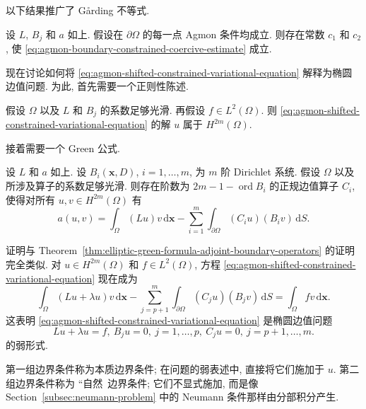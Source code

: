 以下结果推广了 Gårding 不等式.

\begin{Theorem}
\label{thm:agmon-boundary-constrained-coercivity}
设 $L$, $B_j$ 和 $a$ 如上. 假设在 $\partial\Omega$ 的每一点 Agmon 条件均成立. 则存在常数 $c_1$ 和 $c_2$, 使 \eqref{eq:agmon-boundary-constrained-coercive-estimate} 成立.
\end{Theorem}

现在讨论如何将 \eqref{eq:agmon-shifted-constrained-variational-equation} 解释为椭圆边值问题. 为此, 首先需要一个正则性陈述.

\begin{Theorem}
\label{thm:agmon-weak-variational-solution-regularity}
假设 $\Omega$ 以及 $L$ 和 $B_j$ 的系数足够光滑. 再假设 $f\in L^2(\Omega)$. 则 \eqref{eq:agmon-shifted-constrained-variational-equation} 的解 $u$ 属于 $H^{2m}(\Omega)$.
\end{Theorem}

接着需要一个 Green 公式.

\begin{Theorem}
\label{thm:agmon-constrained-form-green-boundary-identity}
设 $L$ 和 $a$ 如上. 设 $B_i(\bm{x},D)$, $i=1,\ldots,m$, 为 $m$ 阶 Dirichlet 系统. 假设 $\Omega$ 以及所涉及算子的系数足够光滑. 则存在阶数为 $2m-1-\operatorname{ord}B_i$ 的正规边值算子 $C_i$, 使得对所有 $u,v\in H^{2m}(\Omega)$ 有
\begin{equation}\label{eq:agmon-constrained-form-green-boundary-identity}
a(u,v)=\int_\Omega(Lu)v\,\mathrm{d}\bm{x}-\sum_{i=1}^m\int_{\partial\Omega}(C_iu)(B_iv)\,\mathrm{d}S.
\end{equation}

\end{Theorem}

证明与 Theorem~\ref{thm:elliptic-green-formula-adjoint-boundary-operators} 的证明完全类似. 对 $u\in H^{2m}(\Omega)$ 和 $f\in L^2(\Omega)$, 方程 \eqref{eq:agmon-shifted-constrained-variational-equation} 现在成为
\begin{equation}\label{eq:agmon-shifted-form-natural-boundary-reduction}
\int_\Omega(Lu+\lambda u)v\,\mathrm{d}\bm{x}-\sum_{j=p+1}^m\int_{\partial\Omega}(C_ju)(B_jv)\,\mathrm{d}S=\int_\Omega fv\,\mathrm{d}\bm{x}.
\end{equation}
这表明 \eqref{eq:agmon-shifted-constrained-variational-equation} 是椭圆边值问题
\begin{equation}\label{eq:agmon-essential-natural-boundary-value-problem}
Lu+\lambda u=f,\ B_ju=0,\ j=1,\ldots,p,\ C_ju=0,\ j=p+1,\ldots,m.
\end{equation}
的弱形式.

第一组边界条件称为本质边界条件; 在问题的弱表述中, 直接将它们施加于 $u$. 第二组边界条件称为 ``自然\textquotesingle\textquotesingle\ 边界条件; 它们不显式施加, 而是像 Section~\ref{subsec:neumann-problem} 中的 Neumann 条件那样由分部积分产生.
